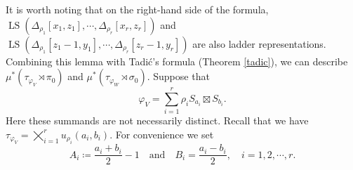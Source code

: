 \documentclass[11pt,letterpaper]{amsart}
\theoremstyle{plain}
\numberwithin{theorem}{section}
\numberwithin{equation}{subsection}
\theoremstyle{remark}
\newcommand{\LS}{\operatorname{LS}} %
\begin{document}
\vskip 5pt

It is worth noting that on the right-hand side of the formula, $\LS\left(\Delta_{\rho_1}[x_1,z_1],\cdots,\Delta_{\rho_r}[x_r,z_r]\right)$ and $\LS\left(\Delta_{\rho_1}[z_1-1,y_1],\cdots,\Delta_{\rho_r}[z_r-1,y_r]\right)$ are also ladder representations. 
\iffalse%
Combining this lemma with Tadi\'c's formula (Theorem \ref{tadic}), we can describe $\mu^*\left(\tau_{\varphi_V}\rtimes\pi_0\right)$ and $\mu^*\left(\tau_{\varphi_W}\rtimes \sigma_0\right)$. Suppose that
\[
    \varphi_V = \sum_{i=1}^r \rho_i S_{a_i}\boxtimes S_{b_i}.
\]
Here these summands are not necessarily distinct. Recall that we have $\tau_{\varphi_V} = \bigtimes_{i=1}^r u_{\rho_i}\left(a_i,b_i\right)$. For convenience we set
\[
    A_i \coloneqq \frac{a_i+b_i}{2}-1 \quad \text{and}\quad B_i = \frac{a_i-b_i}{2}, \quad i=1,2,\cdots,r.
\]
\end{document}
